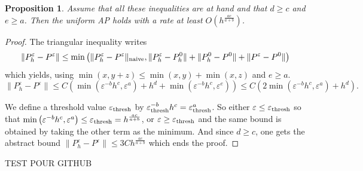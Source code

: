 \documentclass[a4paper,french,english,10pt]{article}
\newcommand\eps{\varepsilon}
\newtheorem{pro}[theorem]{Proposition}
\begin{document}
\begin{pro} \label{prop:1}
 Assume that all these inequalities are at 
hand and that $d\geq c$ and $e\geq a$.
 Then the uniform AP holds with a rate at least
$O\left(h{^\frac{ac}{a+b}  } \right)$.
\end{pro}
\begin{proof}
The triangular inequality writes
$$
\| P_h^\varepsilon - P^\varepsilon   \|
\leq
\min
\left(
\| P_h^\varepsilon - P^\varepsilon   \|_{ {\rm naive}},
\| P_h^\eps-P_h^0\|+
\| P_h^0 - P^0   \| +
\| P^\varepsilon - P^0 \|
\right)
$$
which yields, using $\min(x,y+z)\leq \min(x,y)+\min(x,z)$ and   $e\geq a$.
\begin{equation} \label{eq:toutdebut}
\| P_h^\varepsilon - P^\varepsilon   \|
\leq
C\left(
\min
\left(
 \varepsilon ^{-b}h^c,
\eps^a
\right)+h^d+
\min\left(
 \varepsilon ^{-b}h^c,
\eps^e
\right)\right)
\leq C\left(
2\min  
\left(
 \varepsilon ^{-b}h^c,
\eps^a
\right) +h^d\right).
\end{equation}

We define a  threshold value $\varepsilon_{\rm thresh} $
by  $\varepsilon_{\rm thresh}  ^{-b}h^c=
\eps_{\rm thresh}^a$. So either $\eps\leq \varepsilon_{\rm thresh} $
so that $\min
\left(
 \varepsilon ^{-b}h^c,
\eps^a
\right)\leq \varepsilon_{\rm thresh} =h^{\frac{ac}{a+b}  }$, or 
$\eps\geq \varepsilon_{\rm thresh} $ and the same bound is obtained by 
taking the other term as the minimum.
And since $d\geq c$, one gets the abstract bound
$
\| P_h^\varepsilon - P^\varepsilon   \|
\leq
3Ch^{\frac{ac}{a+b}  }
$ which ends the proof.
\end{proof}
TEST POUR GITHUB
\end{document}
